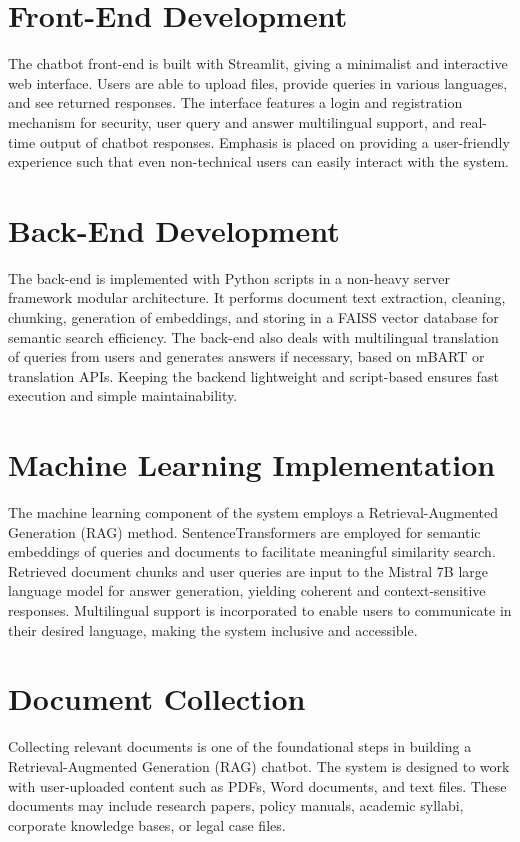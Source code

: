 \documentclass[12pt]{report}
\begin{document}
\section{Front-End Development}
The chatbot front-end is built with Streamlit, giving a minimalist and interactive web interface. Users are able to upload files, provide queries in various languages, and see returned responses. The interface features a login and registration mechanism for security, user query and answer multilingual support, and real-time output of chatbot responses. Emphasis is placed on providing a user-friendly experience such that even non-technical users can easily interact with the system.


\section{Back-End Development}
The back-end is implemented with Python scripts in a non-heavy server framework modular architecture. It performs document text extraction, cleaning, chunking, generation of embeddings, and storing in a FAISS vector database for semantic search efficiency. The back-end also deals with multilingual translation of queries from users and generates answers if necessary, based on mBART or translation APIs. Keeping the backend lightweight and script-based ensures fast execution and simple maintainability.


\section{Machine Learning Implementation}
The machine learning component of the system employs a Retrieval-Augmented Generation (RAG) method. SentenceTransformers are employed for semantic embeddings of queries and documents to facilitate meaningful similarity search. Retrieved document chunks and user queries are input to the Mistral 7B large language model for answer generation, yielding coherent and context-sensitive responses. Multilingual support is incorporated to enable users to communicate in their desired language, making the system inclusive and accessible.


\section{Document Collection}
Collecting relevant documents is one of the foundational steps in building a Retrieval-Augmented Generation (RAG) chatbot. The system is designed to work with user-uploaded content such as PDFs, Word documents, and text files. These documents may include research papers, policy manuals, academic syllabi, corporate knowledge bases, or legal case files.
\end{document}
